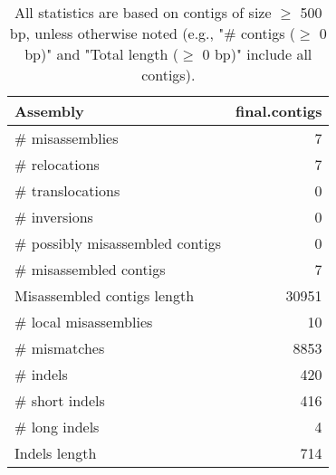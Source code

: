 \documentclass[12pt,a4paper]{article}
\begin{document}
\begin{table}[ht]
\begin{center}
\caption{All statistics are based on contigs of size $\geq$ 500 bp, unless otherwise noted (e.g., "\# contigs ($\geq$ 0 bp)" and "Total length ($\geq$ 0 bp)" include all contigs).}
\begin{tabular}{|l*{1}{|r}|}
\hline
Assembly & final.contigs \\ \hline
\# misassemblies & 7 \\ \hline
\hspace{5mm}\# relocations & 7 \\ \hline
\hspace{5mm}\# translocations & 0 \\ \hline
\hspace{5mm}\# inversions & 0 \\ \hline
\# possibly misassembled contigs & 0 \\ \hline
\# misassembled contigs & 7 \\ \hline
Misassembled contigs length & 30951 \\ \hline
\# local misassemblies & 10 \\ \hline
\# mismatches & 8853 \\ \hline
\# indels & 420 \\ \hline
\hspace{5mm}\# short indels & 416 \\ \hline
\hspace{5mm}\# long indels & 4 \\ \hline
Indels length & 714 \\ \hline
\end{tabular}
\end{center}
\end{table}
\end{document}
